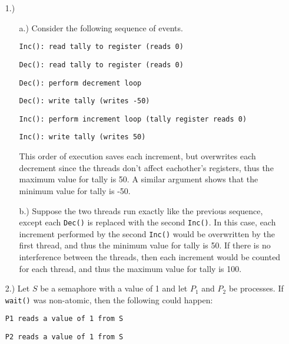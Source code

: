 \documentclass[12pt]{article}
\begin{document}
    \pagestyle{fancy}


    \begin{itemize}
        \item [1.)] \begin{itemize}
            \item [a.)] Consider the following sequence of events.

                \verb|Inc(): read tally to register (reads 0)|

                \verb|Dec(): read tally to register (reads 0)|

                \verb|Dec(): perform decrement loop|

                \verb|Dec(): write tally (writes -50)|

                \verb|Inc(): perform increment loop (tally register reads 0)|

                \verb|Inc(): write tally (writes 50)|

                This order of execution saves each increment, but overwrites
                each decrement since the threads don't affect eachother's
                registers, thus the maximum value for tally is 50.
                A similar argument shows that the minimum value for tally is
                -50.

            \item [b.)] Suppose the two threads run exactly like the previous
                sequence, except each \verb|Dec()| is replaced with the
                second \verb|Inc()|.
                In this case, each increment performed by the second
                \verb|Inc()| would be overwritten by the first thread, and thus
                the minimum value for tally is 50.
                If there is no interference between the threads, then each
                increment would be counted for each thread, and thus the
                maximum value for tally is 100.
        \end{itemize}

        \item [2.)] Let \( S \) be a semaphore with a value of 1 and let
            \( P_1 \) and \( P_2 \) be processes.
            If \verb|wait()| was non-atomic, then the following could happen:

            \verb|P1 reads a value of 1 from S|

            \verb|P2 reads a value of 1 from S|


\end{itemize}
\end{document}
